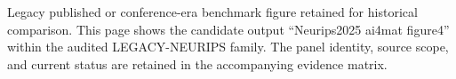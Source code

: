 Legacy published or conference-era benchmark figure retained for historical comparison. This page shows the candidate output ``Neurips2025 ai4mat figure4'' within the audited LEGACY-NEURIPS family. The panel identity, source scope, and current status are retained in the accompanying evidence matrix.
